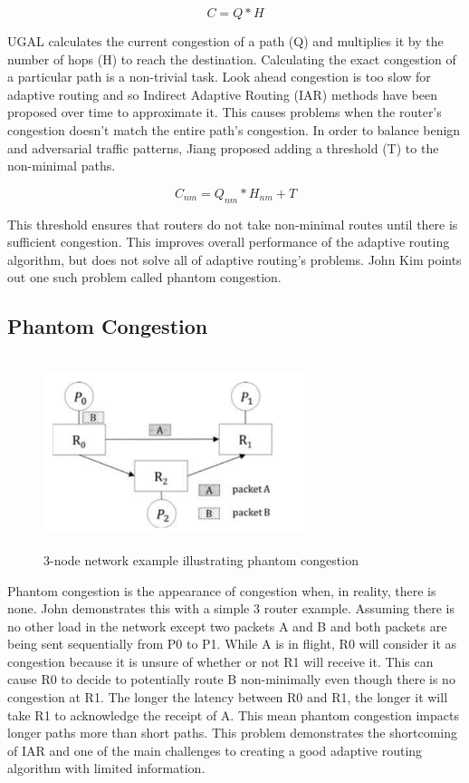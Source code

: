 \documentclass[conference,12pt]{IEEEtran}
\begin{document}
\[C = Q * H\]

UGAL calculates the current congestion of a path (Q) and multiplies it by the number of hops (H) to reach the destination. Calculating the exact congestion of a particular path is a non-trivial task. Look ahead congestion is too slow for adaptive routing and so Indirect Adaptive Routing (IAR) methods have been proposed over time to approximate it. This causes problems when the router's congestion doesn't match the entire path's congestion. In order to balance benign and adversarial traffic patterns, Jiang proposed adding a threshold (T) to the non-minimal paths.\cite{njd09} 

\[C_{nm} = Q_{nm} * H_{nm} + T\]

This threshold ensures that routers do not take non-minimal routes until there is sufficient congestion. This improves overall performance of the adaptive routing algorithm, but does not solve all of adaptive routing's problems. John Kim points out one such problem called phantom congestion.

\subsection{Phantom Congestion}

\begin{figure}[ht]
  \begin{center}
    \includegraphics[width=3.0in,height=2.2in]{figures/PhantomCongestion.png}
  \end{center}
   \vspace{-0.25in}
 \caption[Dragonfly Topology]{3-node network example illustrating phantom congestion\cite{wkkjps15}}
 \label{fig:PhantomCongestion}
\end{figure}

Phantom congestion is the appearance of congestion when, in reality, there is none. John demonstrates this with a simple 3 router example. Assuming there is no other load in the network except two packets A and B and both packets are being sent sequentially from P0 to P1. While A is in flight, R0 will consider it as congestion because it is unsure of whether or not R1 will receive it. This can cause R0 to decide to potentially route B non-minimally even though there is no congestion at R1. The longer the latency between R0 and R1, the longer it will take R1 to acknowledge the receipt of A. This mean phantom congestion impacts longer paths more than short paths. This problem demonstrates the shortcoming of IAR and one of the main challenges to creating a good adaptive routing algorithm with limited information.
\end{document}

